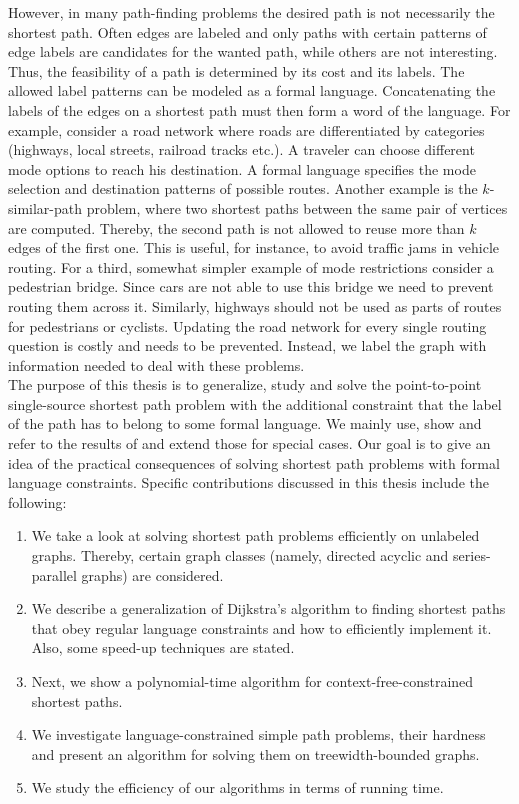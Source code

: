 \documentclass[]{article}
\numberwithin{equation}{section}
\begin{document}
However, in many path-finding problems the desired path is not necessarily the shortest path. Often edges are labeled and only paths with certain patterns of edge labels are candidates for the wanted path, while others are not interesting. Thus, the feasibility of a path is determined by its cost and its labels. The allowed label patterns can be modeled as a formal language. Concatenating the labels of the edges on a shortest path must then form a word of the language. For example, consider a road network where roads are differentiated by categories (highways, local streets, railroad tracks etc.). A traveler can choose different mode options to reach his destination. A formal language specifies the mode selection and destination patterns of possible routes. Another example is the $k$-similar-path problem, where two shortest paths between the same pair of vertices are computed. Thereby, the second path is not allowed to reuse more than $k$ edges of the first one. This is useful, for instance, to avoid traffic jams in vehicle routing. For a third, somewhat simpler example of mode restrictions consider a pedestrian bridge. Since cars are not able to use this bridge we need to prevent routing them across it. Similarly, highways should not be used as parts of routes for pedestrians or cyclists. Updating the road network for every single routing question is costly and needs to be prevented. Instead, we label the graph with information needed to deal with these problems.\\

The purpose of this thesis is to generalize, study and solve the point-to-point single-source shortest path problem with the additional constraint that the label of the path has to belong to some formal language. We mainly use, show and refer to the results of \cite{BJM00} and extend those for special cases. Our goal is to give an idea of the practical consequences of solving shortest path problems with formal language constraints. Specific contributions discussed in this thesis include the following:

\begin{enumerate}
	\item We take a look at solving shortest path problems efficiently on unlabeled graphs. Thereby, certain graph classes (namely, directed acyclic and series-parallel graphs) are considered.
	
	\item We describe a generalization of Dijkstra’s algorithm to finding shortest paths that obey regular language constraints and how to efficiently implement it. Also, some speed-up techniques are stated.
	
	\item Next, we show a polynomial-time algorithm for context-free-constrained shortest paths.
	
	\item We investigate language-constrained simple path problems, their hardness and present an algorithm for solving them on treewidth-bounded graphs.
	
	\item We study the efficiency of our algorithms in terms of running time.
\end{enumerate}
\end{document}
